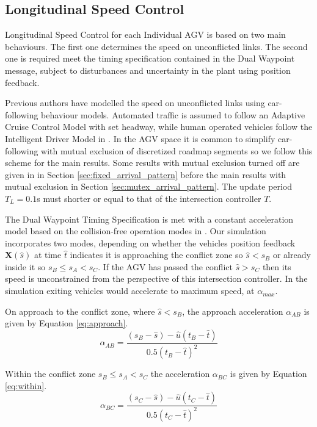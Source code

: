 \subsection{Longitudinal Speed Control}
Longitudinal Speed Control for each Individual AGV is based on two main behaviours. The first one determines the speed on unconflicted links. The second one is required meet the timing specification contained in the Dual Waypoint message, subject to disturbances and uncertainty in the plant using position feedback.  

Previous authors have modelled the speed on unconflicted links using car-following behaviour models. Automated traffic is assumed to follow an Adaptive Cruise Control Model with set headway, while human operated vehicles follow the Intelligent Driver Model in \cite{Baz2020}. In the AGV space it is common to simplify car-following with mutual exclusion of discretized roadmap segments  \cite{Digani2014coord} so we follow this scheme for the main results. Some results with mutual exclusion turned off are given in  in Section \ref{sec:fixed_arrival_pattern} before the main results with mutual exclusion in Section \ref{sec:mutex_arrival_pattern}. The update period $T_L=0.1$s must shorter or equal to that of the intersection controller $T$. 

The Dual Waypoint Timing Specification is met with a constant acceleration model based on the collision-free operation modes in \cite{He2020}. 
Our simulation incorporates two modes, depending on whether the vehicles position feedback $\bm{X}(\hat{s})$ at time $\hat{t}$ indicates it is approaching the conflict zone so $\hat{s}<s_B$ or already inside it so $s_B\leq s_A<s_C$. If the AGV has passed the conflict $\hat{s}>s_C$ then its speed is unconstrained from the perspective of this intersection controller. In the simulation exiting vehicles would accelerate to maximum speed, at $\alpha_{max}$.

On approach to the conflict zone, where $\hat{s}<s_B$, the approach acceleration $\alpha_{AB}$ is given by Equation \ref{eq:approach}.
\begin{equation}
\alpha_{AB} = \frac{(s_B - \hat{s}) - \hat{u}(t_B - \hat{t}) }{0.5 (t_B - \hat{t})^2}
\label{eq:approach}
\end{equation}

Within the conflict zone $s_B \leq s_A<s_C$ the acceleration $\alpha_{BC}$ is given by Equation \ref{eq:within}.
\begin{equation}
\alpha_{BC} = \frac{(s_C - \hat{s}) - \hat{u}(t_C - \hat{t}) }{0.5 (t_C - \hat{t})^2}
\label{eq:within}
\end{equation}

